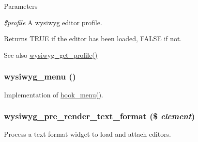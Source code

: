 \begin{DoxyParams}{Parameters}
\item[{\em \$profile}]A wysiwyg editor profile.\end{DoxyParams}
\begin{DoxyReturn}{Returns}
TRUE if the editor has been loaded, FALSE if not.
\end{DoxyReturn}
\begin{DoxySeeAlso}{See also}
\hyperlink{wysiwyg_8module_aa06388aeffb7f00e3b20466dc40f71b5}{wysiwyg\_\-get\_\-profile()} 
\end{DoxySeeAlso}
\hypertarget{wysiwyg_8module_a7bbcb615ff86965ede6de1ebdaf1f360}{
\subsubsection[{wysiwyg\_\-menu}]{\setlength{\rightskip}{0pt plus 5cm}wysiwyg\_\-menu ()}}
\label{wysiwyg_8module_a7bbcb615ff86965ede6de1ebdaf1f360}
Implementation of \hyperlink{group__hooks_ga5c95244fea59b25666e409759e133ded}{hook\_\-menu()}. \hypertarget{wysiwyg_8module_ad53fe3535b2c8eab8bbbb88ed694af97}{
\subsubsection[{wysiwyg\_\-pre\_\-render\_\-text\_\-format}]{\setlength{\rightskip}{0pt plus 5cm}wysiwyg\_\-pre\_\-render\_\-text\_\-format (\$ {\em element})}}
\label{wysiwyg_8module_ad53fe3535b2c8eab8bbbb88ed694af97}
Process a text format widget to load and attach editors.

